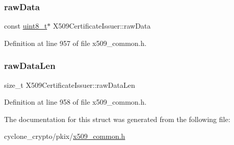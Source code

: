 \subsubsection{\texorpdfstring{raw\+Data}{rawData}}
{\footnotesize\ttfamily const \hyperlink{stdint_8h_aba7bc1797add20fe3efdf37ced1182c5}{uint8\+\_\+t}$\ast$ X509\+Certificate\+Issuer\+::raw\+Data}



Definition at line 957 of file x509\+\_\+common.\+h.

\mbox{\label{structX509CertificateIssuer_a7de1a5e5319cc043ecf8caee5e144a58}} 
\subsubsection{\texorpdfstring{raw\+Data\+Len}{rawDataLen}}
{\footnotesize\ttfamily size\+\_\+t X509\+Certificate\+Issuer\+::raw\+Data\+Len}



Definition at line 958 of file x509\+\_\+common.\+h.



The documentation for this struct was generated from the following file\+:\begin{DoxyCompactItemize}
\item 
cyclone\+\_\+crypto/pkix/\hyperlink{pkix_2x509__common_8h}{x509\+\_\+common.\+h}\end{DoxyCompactItemize}
